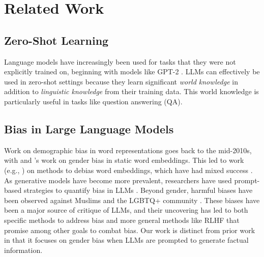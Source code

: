 \section{Related Work}
\subsection{Zero-Shot Learning}
Language models have increasingly been used for tasks that they were not explicitly trained on, beginning with models like GPT-2 \cite{radford2019language}. LLMs can effectively be used in zero-shot settings because they learn significant \textit{world knowledge} in addition to \textit{linguistic knowledge} from their training data. This world knowledge is particularly useful in tasks like question answering (QA).%


\subsection{Bias in Large Language Models}
Work on demographic bias in word representations goes back to the mid-2010s, with \citet{bolukbasi2016man} and \citet{caliskan2017semantics}'s work on gender bias in static word embeddings. This led to work (e.g., \citet{zhao-etal-2018-learning}) on methods to debias word embeddings, which have had mixed success \cite{gonen-goldberg-2019-lipstick}. As generative models have become more prevalent, researchers have used prompt-based strategies to quantify bias in LLMs \cite{sheng-etal-2019-woman,lucy-bamman-2021-gender}. Beyond gender, harmful biases have been observed against Muslims \cite{abid2021persistentantimuslim} and the LGBTQ+ community \cite{felkner-etal-2023-winoqueer}. These biases have been a major source of critique of LLMs, and their uncovering has led to both specific methods to address bias \cite{liang2021towards} and more general methods like RLHF \cite{ouyang2022training} that promise among other goals to combat bias. Our work is distinct from prior work in that it focuses on gender bias when LLMs are prompted to generate factual information.